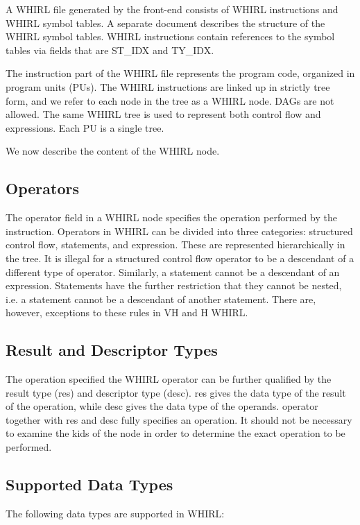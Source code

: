 \documentclass{article}
\begin{document}
A WHIRL file generated by the front-end consists of WHIRL instructions
and WHIRL symbol tables. A separate document describes the structure of the WHIRL symbol tables. WHIRL instructions
contain references to the symbol tables via fields that are ST\_IDX
and TY\_IDX. 

The instruction part of the WHIRL file represents the
program code, organized in program units (PUs). The WHIRL instructions
are linked up in strictly tree form, and we refer to each node in
the tree as a WHIRL node. DAGs are not allowed. The same WHIRL tree
is used to represent both control flow and expressions. Each PU is
a single tree. 

We now describe the content of the WHIRL node.

\subsection{Operators}

The operator field in a WHIRL node specifies the operation performed by
the instruction. Operators in WHIRL can be divided into three
categories: structured control flow, statements, and expression.
These are represented hierarchically in the tree. It is illegal
for a structured control flow operator to be a descendant of a
different type of operator. Similarly, a statement cannot be a
descendant of an expression. Statements have the further restriction
that they cannot be nested, i.e. a statement cannot be a  descendant
of another statement. There are, however, exceptions to these rules
in VH and H WHIRL.

\subsection{Result and Descriptor Types}

The operation specified the WHIRL operator can be further qualified
by the result type (res) and descriptor type (desc). res gives the
data type of the result of the operation, while desc gives the data
type of the operands. operator together with res and desc fully
specifies an operation. It should not be necessary to examine the
kids of the node in order to determine the exact operation to be
performed.

\subsection{Supported Data Types}

The following data types are supported in WHIRL:
\end{document}
